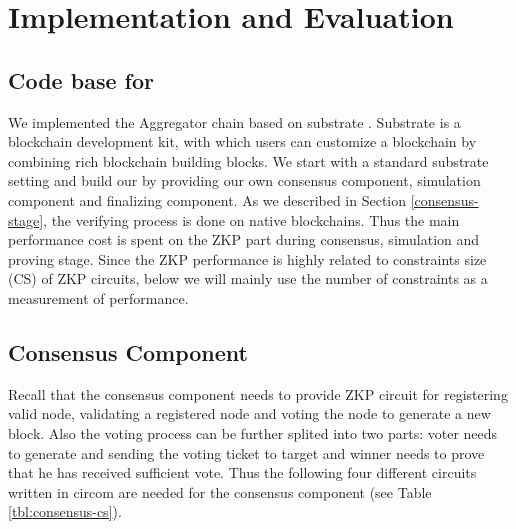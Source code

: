 \section{Implementation and Evaluation}
\label{chp:bench}
\subsection{Code base for \dprotocol}
We implemented the Aggregator chain based on substrate \cite{substrate}. Substrate is a blockchain development kit, with which users can customize a blockchain by combining rich blockchain building blocks. We start with a standard substrate setting and build our \dprotocol by providing our own consensus component, simulation component and finalizing component. As we described in Section \ref{consensus-stage}, the verifying process is done on native blockchains. Thus the main performance cost is spent on the ZKP part during consensus, simulation and proving stage. Since the ZKP performance is highly related to constraints size (CS) of ZKP circuits, below we will mainly use the number of constraints as a measurement of performance. 

\subsection {Consensus Component}
Recall that the consensus component needs to provide ZKP circuit for registering valid node, validating a registered node and voting the node to generate a new block. Also the voting process can be further splited into two parts: voter needs to generate and sending the voting ticket to target and winner needs to prove that he has received sufficient vote.  Thus the following four different circuits written in circom \cite{munoz2022circom} are needed for the consensus component (see Table \ref{tbl:consensus-cs}).

